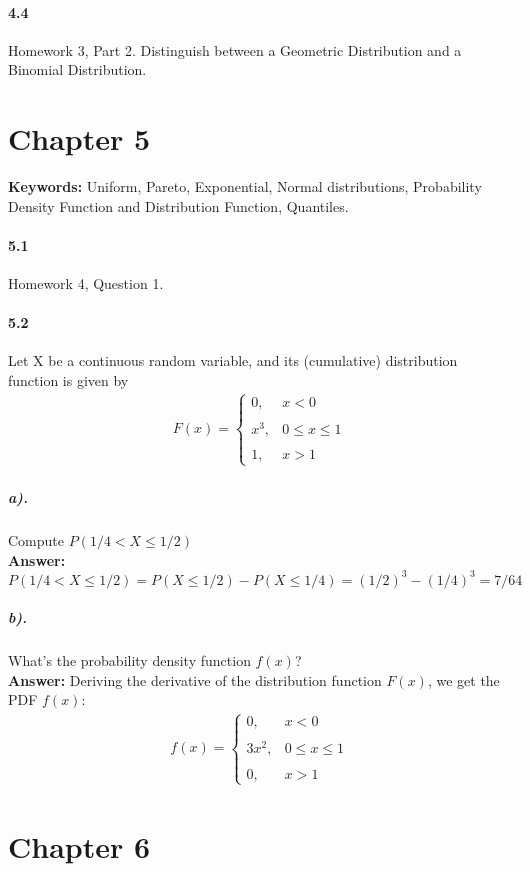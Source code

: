 \documentclass[11pt]{article} %
\begin{document}
\paragraph*{4.4} Homework 3, Part 2. Distinguish between a Geometric Distribution and a Binomial Distribution. 


\section{Chapter 5}
\textbf{Keywords:} Uniform, Pareto, Exponential, Normal distributions, Probability Density Function and Distribution Function, Quantiles.
\paragraph*{5.1} Homework 4, Question 1.
\paragraph*{5.2} Let X be a continuous random variable, and its (cumulative) distribution function is given by
\begin{align*}
F(x) = \left\lbrace
\begin{array}{ll} 
0, & x < 0 \\
& \\
x^3, & 0 \leq x \leq 1 \\ 
& \\
1, & x > 1
\end{array}
\right.
\end{align*}

\subparagraph*{a).} Compute $P(1/4 < X \leq 1/2)$ \\
\textbf{Answer:} $P(1/4 < X \leq 1/2) = P(X \leq 1/2) - P(X \leq 1/4) = (1/2)^3 - (1/4)^3 = 7/64$
\subparagraph*{b).} What's the probability density function $f(x)$?\\
\textbf{Answer:} Deriving the derivative of the distribution function $F(x)$, we get the PDF $f(x)$:
\begin{align*}
f(x) = \left\lbrace
\begin{array}{ll} 
0, & x < 0 \\
& \\
3x^2, & 0 \leq x \leq 1 \\ 
& \\
0, & x > 1
\end{array}
\right.
\end{align*}

\section{Chapter 6}
\end{document}
